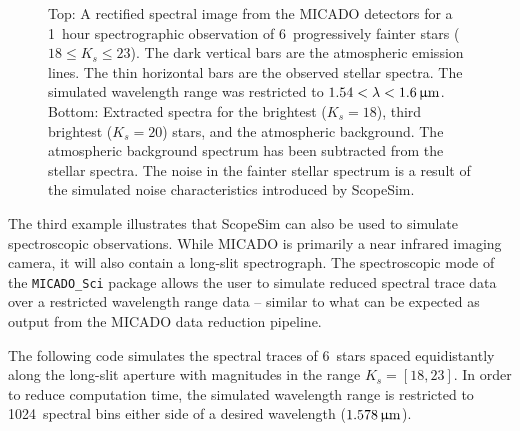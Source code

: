 \begin{figure}

\begin{center}
\caption{Top: A rectified spectral image from the MICADO detectors for a 1~hour spectrographic observation of 6~progressively fainter stars ($18\leq K_s\leq 23$).
The dark vertical bars are the atmospheric emission lines.
The thin horizontal bars are the observed stellar spectra.
The simulated wavelength range was restricted to $1.54<\lambda<1.6\,\upmu\mathrm{m}$.
Bottom: Extracted spectra for the brightest ($K_s=18$), third brightest ($K_s=20$) stars, and the atmospheric background.
The atmospheric background spectrum has been subtracted from the stellar spectra.
The noise in the fainter stellar spectrum is a result of the simulated noise characteristics introduced by ScopeSim.}
\label{fig:example-3-spectra}
\end{center}

\end{figure}

The third example illustrates that ScopeSim can also be used to simulate spectroscopic observations.
While MICADO is primarily a near infrared imaging camera, it will also contain a long-slit spectrograph.
The spectroscopic mode of the \lstinline{MICADO_Sci} package allows the user to simulate reduced spectral trace data over a restricted wavelength range data -- similar to what can be expected as output from the MICADO data reduction pipeline.

The following code simulates the spectral traces of 6~stars spaced equidistantly along the long-slit aperture with magnitudes in the range $K_s=[18, 23]$.
In order to reduce computation time, the simulated wavelength range is restricted to 1024~spectral bins either side of a desired wavelength ($1.578\,\upmu\mathrm{m}$).

